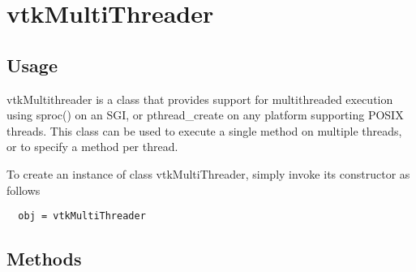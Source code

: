 \section{vtkMultiThreader}

\subsection{Usage}

 vtkMultithreader is a class that provides support for multithreaded
 execution using sproc() on an SGI, or pthread\_create on any platform
 supporting POSIX threads.  This class can be used to execute a single
 method on multiple threads, or to specify a method per thread. 

To create an instance of class vtkMultiThreader, simply
invoke its constructor as follows
\begin{verbatim}
  obj = vtkMultiThreader
\end{verbatim}
\subsection{Methods}

